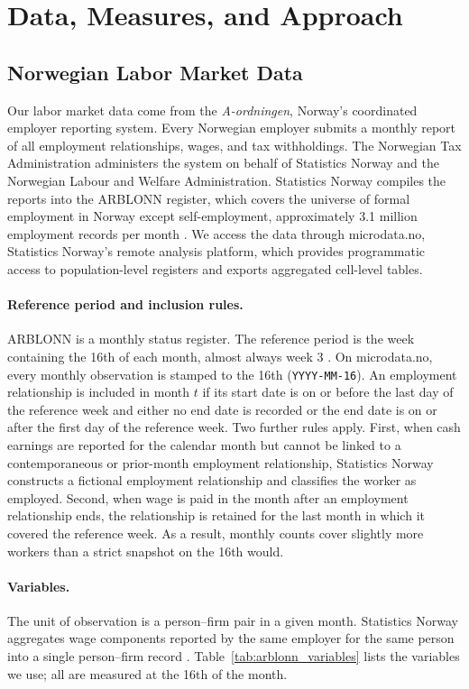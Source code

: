 \section{Data, Measures, and Approach}\label{sec:data}

\subsection{Norwegian Labor Market Data}\label{sec:data:labor}

Our labor market data come from the \emph{A-ordningen}, Norway's coordinated employer reporting system. Every Norwegian employer submits a monthly report of all employment relationships, wages, and tax withholdings. The Norwegian Tax Administration administers the system on behalf of Statistics Norway and the Norwegian Labour and Welfare Administration. Statistics Norway compiles the reports into the ARBLONN register, which covers the universe of formal employment in Norway except self-employment, approximately 3.1 million employment records per month \citep{ssb_arblonn_doc}. We access the data through microdata.no, Statistics Norway's remote analysis platform, which provides programmatic access to population-level registers and exports aggregated cell-level tables.

\paragraph{Reference period and inclusion rules.}
ARBLONN is a monthly status register. The reference period is the week containing the 16th of each month, almost always week 3 \citep{ssb_klassifisering}. On microdata.no, every monthly observation is stamped to the 16th (\texttt{YYYY-MM-16}). An employment relationship is included in month $t$ if its start date is on or before the last day of the reference week and either no end date is recorded or the end date is on or after the first day of the reference week. Two further rules apply. First, when cash earnings are reported for the calendar month but cannot be linked to a contemporaneous or prior-month employment relationship, Statistics Norway constructs a fictional employment relationship and classifies the worker as employed. Second, when wage is paid in the month after an employment relationship ends, the relationship is retained for the last month in which it covered the reference week. As a result, monthly counts cover slightly more workers than a strict snapshot on the 16th would.

\paragraph{Variables.}
The unit of observation is a person--firm pair in a given month. Statistics Norway aggregates wage components reported by the same employer for the same person into a single person--firm record \citep{ssb_klassifisering}. Table~\ref{tab:arblonn_variables} lists the variables we use; all are measured at the 16th of the month.

